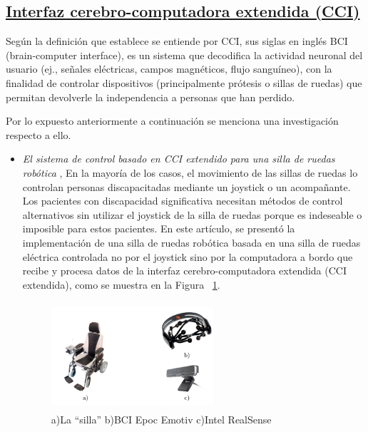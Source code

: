 \documentclass[10pt,journal]{IEEEtran}
\begin{document}
    \subsection{\underline{\textbf{Interfaz cerebro-computadora extendida (CCI)}}}
    Según la definición que establece \citep{trofimov2011brain} se entiende por CCI, sus siglas en inglés BCI (brain-computer interface), es un sistema que decodifica la actividad neuronal del usuario (ej., señales eléctricas, campos magnéticos, flujo sanguíneo), con la finalidad de controlar dispositivos (principalmente prótesis o sillas de ruedas) que permitan devolverle la independencia a personas que han perdido.
    
    Por lo expuesto anteriormente a continuación se menciona una investigación respecto a ello.
    
    \begin{itemize}
    \item  \textit{El sistema de control basado en CCI extendido para una silla de ruedas robótica} \citep{VOZNENKO2018522},
    En la mayoría de los casos, el movimiento de las sillas de ruedas lo controlan personas discapacitadas mediante un joystick o un acompañante. Los pacientes con discapacidad significativa necesitan métodos de control alternativos sin utilizar el joystick de la silla de ruedas porque es indeseable o imposible para estos pacientes. En este artículo, se presentó la implementación de una silla de ruedas robótica basada en una silla de ruedas eléctrica controlada no por el joystick sino por la computadora a bordo que recibe y procesa datos de la interfaz cerebro-computadora extendida (CCI extendida), como se muestra en la Figura ~\ref{f36}. 
    
    \begin{figure}[H]
        \begin{center}
        \includegraphics[width=6cm, height=4cm]{figuras/silla2.PNG}
        \caption{a)La “silla” b)BCI Epoc Emotiv c)Intel RealSense}
        \label{f36} 
        \end{center}
    \end{figure}
    

\end{itemize}
\end{document}
